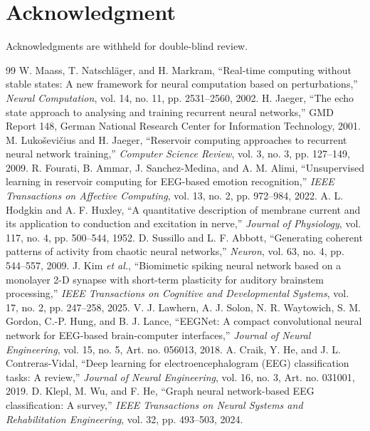 \documentclass[journal]{IEEEtran}
\begin{document}
\section*{Acknowledgment}
Acknowledgments are withheld for double-blind review.

\balance
\begin{thebibliography}{99}
 W. Maass, T. Natschl\"ager, and H. Markram, ``Real-time computing without stable states: A new framework for neural computation based on perturbations,'' \emph{Neural Computation}, vol. 14, no. 11, pp. 2531--2560, 2002.
 H. Jaeger, ``The echo state approach to analysing and training recurrent neural networks,'' GMD Report 148, German National Research Center for Information Technology, 2001.
 M. Luko\v{s}evi\v{c}ius and H. Jaeger, ``Reservoir computing approaches to recurrent neural network training,'' \emph{Computer Science Review}, vol. 3, no. 3, pp. 127--149, 2009.
 R. Fourati, B. Ammar, J. Sanchez-Medina, and A. M. Alimi, ``Unsupervised learning in reservoir computing for EEG-based emotion recognition,'' \emph{IEEE Transactions on Affective Computing}, vol. 13, no. 2, pp. 972--984, 2022.
 A. L. Hodgkin and A. F. Huxley, ``A quantitative description of membrane current and its application to conduction and excitation in nerve,'' \emph{Journal of Physiology}, vol. 117, no. 4, pp. 500--544, 1952.
 D. Sussillo and L. F. Abbott, ``Generating coherent patterns of activity from chaotic neural networks,'' \emph{Neuron}, vol. 63, no. 4, pp. 544--557, 2009.
 J. Kim \emph{et al.}, ``Biomimetic spiking neural network based on a monolayer 2-D synapse with short-term plasticity for auditory brainstem processing,'' \emph{IEEE Transactions on Cognitive and Developmental Systems}, vol. 17, no. 2, pp. 247--258, 2025.
 V. J. Lawhern, A. J. Solon, N. R. Waytowich, S. M. Gordon, C.-P. Hung, and B. J. Lance, ``EEGNet: A compact convolutional neural network for EEG-based brain-computer interfaces,'' \emph{Journal of Neural Engineering}, vol. 15, no. 5, Art. no. 056013, 2018.
 A. Craik, Y. He, and J. L. Contreras-Vidal, ``Deep learning for electroencephalogram (EEG) classification tasks: A review,'' \emph{Journal of Neural Engineering}, vol. 16, no. 3, Art. no. 031001, 2019.
 D. Klepl, M. Wu, and F. He, ``Graph neural network-based EEG classification: A survey,'' \emph{IEEE Transactions on Neural Systems and Rehabilitation Engineering}, vol. 32, pp. 493--503, 2024.

\end{thebibliography}
\end{document}
